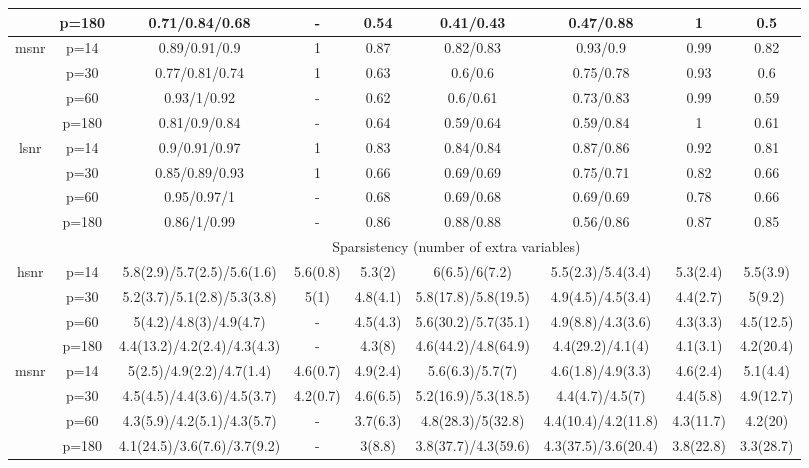 \begin{table}[ht]
{\begin{tabular}{|c|c|ccccccc|}
   & p=180 & 0.71/0.84/0.68 & - & 0.54 & 0.41/0.43 & 0.47/0.88 & 1 & 0.5 \\ 
  \midrule\multirow{4}[2]{*}{msnr} & p=14 & 0.89/0.91/0.9 & 1 & 0.87 & 0.82/0.83 & 0.93/0.9 & 0.99 & 0.82 \\ 
   & p=30 & 0.77/0.81/0.74 & 1 & 0.63 & 0.6/0.6 & 0.75/0.78 & 0.93 & 0.6 \\ 
   & p=60 & 0.93/1/0.92 & - & 0.62 & 0.6/0.61 & 0.73/0.83 & 0.99 & 0.59 \\ 
   & p=180 & 0.81/0.9/0.84 & - & 0.64 & 0.59/0.64 & 0.59/0.84 & 1 & 0.61 \\ 
  \midrule\multirow{4}[2]{*}{lsnr} & p=14 & 0.9/0.91/0.97 & 1 & 0.83 & 0.84/0.84 & 0.87/0.86 & 0.92 & 0.81 \\ 
   & p=30 & 0.85/0.89/0.93 & 1 & 0.66 & 0.69/0.69 & 0.75/0.71 & 0.82 & 0.66 \\ 
   & p=60 & 0.95/0.97/1 & - & 0.68 & 0.69/0.68 & 0.69/0.69 & 0.78 & 0.66 \\ 
   & p=180 & 0.86/1/0.99 & - & 0.86 & 0.88/0.88 & 0.56/0.86 & 0.87 & 0.85 \\ 
   \midrule 
 \multicolumn{1}{|c}{} &       & \multicolumn{7}{c|}{Sparsistency (number of extra variables)} \\
\midrule\multirow{4}[2]{*}{hsnr} & p=14 & 5.8(2.9)/5.7(2.5)/5.6(1.6) & 5.6(0.8) & 5.3(2) & 6(6.5)/6(7.2) & 5.5(2.3)/5.4(3.4) & 5.3(2.4) & 5.5(3.9) \\ 
   & p=30 & 5.2(3.7)/5.1(2.8)/5.3(3.8) & 5(1) & 4.8(4.1) & 5.8(17.8)/5.8(19.5) & 4.9(4.5)/4.5(3.4) & 4.4(2.7) & 5(9.2) \\ 
   & p=60 & 5(4.2)/4.8(3)/4.9(4.7) & - & 4.5(4.3) & 5.6(30.2)/5.7(35.1) & 4.9(8.8)/4.3(3.6) & 4.3(3.3) & 4.5(12.5) \\ 
   & p=180 & 4.4(13.2)/4.2(2.4)/4.3(4.3) & - & 4.3(8) & 4.6(44.2)/4.8(64.9) & 4.4(29.2)/4.1(4) & 4.1(3.1) & 4.2(20.4) \\ 
  \midrule\multirow{4}[2]{*}{msnr} & p=14 & 5(2.5)/4.9(2.2)/4.7(1.4) & 4.6(0.7) & 4.9(2.4) & 5.6(6.3)/5.7(7) & 4.6(1.8)/4.9(3.3) & 4.6(2.4) & 5.1(4.4) \\ 
   & p=30 & 4.5(4.5)/4.4(3.6)/4.5(3.7) & 4.2(0.7) & 4.6(6.5) & 5.2(16.9)/5.3(18.5) & 4.4(4.7)/4.5(7) & 4.4(5.8) & 4.9(12.7) \\ 
   & p=60 & 4.3(5.9)/4.2(5.1)/4.3(5.7) & - & 3.7(6.3) & 4.8(28.3)/5(32.8) & 4.4(10.4)/4.2(11.8) & 4.3(11.7) & 4.2(20) \\ 
   & p=180 & 4.1(24.5)/3.6(7.6)/3.7(9.2) & - & 3(8.8) & 3.8(37.7)/4.3(59.6) & 4.3(37.5)/3.6(20.4) & 3.8(22.8) & 3.3(28.7) \\ 

\end{tabular}}
\end{table}
